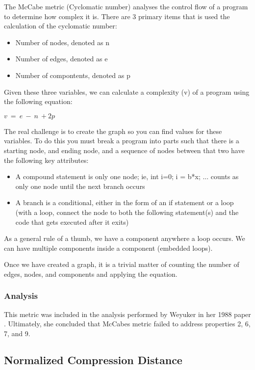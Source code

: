 \documentclass[]{article}
\begin{document}
The McCabe metric (Cyclomatic number) analyses the control flow of a program to determine how complex it is. 
There are 3 primary items that is used the calculation of the cyclomatic number:
\begin{itemize}
	\item Number of nodes, denoted as n
	\item Number of edges, denoted as e
	\item Number of compontents, denoted as p
\end{itemize}

Given these three variables, we can calculate a complexity (v) of a program using the following equation:

$v ~= ~e ~- ~n ~+ 2p$

The real challenge is to create the graph so you can find values for these variables.
To do this you must break a program into parts such that there is a starting node, and ending node, and a sequence of nodes between that two have the following key attributes:
\begin{itemize}
	\item A compound statement is only one node; ie, int i=0; i = b*x; ... counts as only one node until the next branch occurs
	\item A branch is a conditional, either in the form of an if statement or a loop (with a loop, connect the node to both the following statement(s) and the code that gets executed after it exits)
\end{itemize}

As a general rule of a thumb, we have a component anywhere a loop occurs.
We can have multiple components inside a component (embedded loops). 

Once we have created a graph, it is a trivial matter of counting the number of edges, nodes, and components and applying the equation.

\subsubsection{Analysis}

This metric was included in the analysis performed by Weyuker in her 1988 paper \cite{ref:evaluating_software_complexity_measures}.
Ultimately, she concluded that McCabes metric failed to address properties 2, 6, 7, and 9.

\subsection{Normalized Compression Distance}
\end{document}
